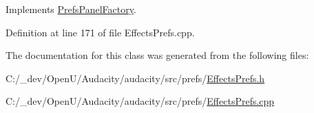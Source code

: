 Implements \hyperlink{class_prefs_panel_factory_a4814184d6050665a43f4929caa73aa0c}{Prefs\+Panel\+Factory}.



Definition at line 171 of file Effects\+Prefs.\+cpp.



The documentation for this class was generated from the following files\+:\begin{DoxyCompactItemize}
\item 
C\+:/\+\_\+dev/\+Open\+U/\+Audacity/audacity/src/prefs/\hyperlink{_effects_prefs_8h}{Effects\+Prefs.\+h}\item 
C\+:/\+\_\+dev/\+Open\+U/\+Audacity/audacity/src/prefs/\hyperlink{_effects_prefs_8cpp}{Effects\+Prefs.\+cpp}\end{DoxyCompactItemize}
